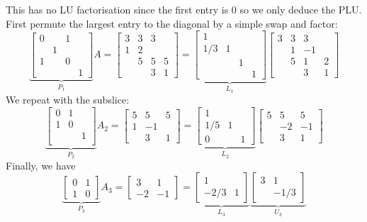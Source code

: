 \documentclass[12pt,a4paper]{article}
\begin{document}
This has no LU factorisation since the first entry is 0 so we only deduce the PLU. First permute the largest entry to the diagonal by a simple swap and factor:
\[
\underbrace{\begin{bmatrix}
0 &  & 1 \\
 & 1 \\
 1 & & 0 \\
 &&& 1
\end{bmatrix}}_{P_1} A = \begin{bmatrix} 3 & 3 &3 \\
1 & 2 \\
 & 5  & 5 & 5 \\
 && 3 & 1 
 \end{bmatrix} = 
  \underbrace{\begin{bmatrix} 1 &  & \\
1/3 & 1 \\
 &   &  1 \\
 &&  & 1 
 \end{bmatrix}}_{L_1}
  \begin{bmatrix} 3 & 3 &3 \\
 & 1 & -1 \\
 & 5  & 1 & 2 \\
 && 3 & 1 
 \end{bmatrix}
\]
We repeat with the subslice:
\[
\underbrace{\begin{bmatrix}
0 & 1 &  \\
1 & 0 \\
  & & 1 \\
\end{bmatrix}}_{P_2}  A_2 =
  \begin{bmatrix} 
  5  & 5 & 5 \\
  1 & -1 \\
 & 3 & 1 
 \end{bmatrix} = 
   \underbrace{\begin{bmatrix} 
  1  &  &  \\
  1/5 & 1 \\
0 &  & 1 
 \end{bmatrix}}_{L_2}   \begin{bmatrix} 
  5  & 5 & 5 \\
   & -2 & -1 \\
 & 3 & 1 
 \end{bmatrix}
\]
Finally, we have
\[
\underbrace{\begin{bmatrix}
0 & 1   \\
1 & 0 
\end{bmatrix}}_{P_3}  A_3 = \begin{bmatrix}3 & 1 \\ -2 & -1 \end{bmatrix}
= \underbrace{\begin{bmatrix}1 &  \\ -2/3 & 1 \end{bmatrix}}_{L_3}
\underbrace{\begin{bmatrix}3 & 1 \\  & -1/3 \end{bmatrix}}_{U_3}
\]
\end{document}
